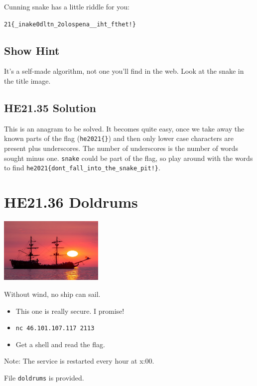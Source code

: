 \documentclass[english,a4paper,nols,noindent]{tufte-handout}
\begin{document}
Cunning snake has a little riddle for you:

\noindent\verb+21{_inake0dltn_2olospena__iht_fthet!}+

\subsection{Show Hint}
It's a self-made algorithm, not one you'll find in the web.
Look at the snake in the title image.


\hypertarget{he21.35-solution}{%
\subsection{HE21.35 Solution}\label{he21.35-solution}}

\noindent This is an anagram to be solved.
It becomes quite easy, once we take away the known parts of the flag
(\verb+he2021{}+) and then only lower case characters are present plus
underscores.  The number of underscores is the number of words sought minus
one.  \verb+snake+ could be part of the flag, so play around with the words to find
\verb+he2021{dont_fall_into_the_snake_pit!}+.



\hypertarget{he21.36}{%
\section{HE21.36 Doldrums}
  \label{he21.36}}
\begin{marginfigure}
    \includegraphics[width=50mm]{images/challenge36.jpg}
\end{marginfigure}

\noindent Without wind, no ship can sail.
\begin{itemize}
\item This one is really secure. I promise!
\item \verb+nc 46.101.107.117 2113+
\item Get a shell and read the flag.
\end{itemize}

\noindent Note: The service is restarted every hour at x:00.

\noindent File \verb+doldrums+ is provided.
\end{document}

